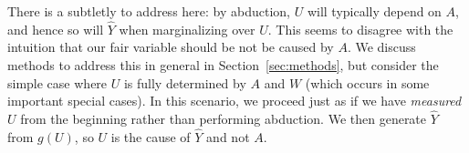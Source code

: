 
There is a subtletly to address here: by abduction,
$U$ will typically depend on $A$, and hence so will $\hat Y$ when
marginalizing over $U$. This seems to disagree with the intuition that our
fair variable should be not be caused by $A$. We discuss
methods to address this in general in Section~\ref{sec:methods},
but consider the simple case where 
$U$ is fully determined by $A$ and $W$
(which occurs in some important special cases).
In this
scenario, we proceed just as if we have {\it measured} $U$ from the
beginning rather than performing abduction.
We then generate $\hat Y$ from $g(U)$, so $U$ is the cause of
$\hat Y$ and not $A$. 



